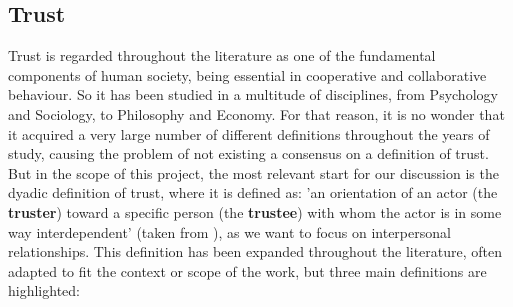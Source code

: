 \subsection{Trust}
\label{subsec:Trust}
Trust is regarded throughout the literature as one of the fundamental components of human society, being essential in cooperative and collaborative behaviour. So it has been studied in a multitude of disciplines, from Psychology and Sociology, to Philosophy and Economy\cite{Rousseau1998, Jones1997, Sabater2005}. For that reason, it is no wonder that it acquired a very large number of different definitions throughout the years of study, causing the problem of not existing a consensus on a definition of trust\cite{Castelfranchi2010}. But in the scope of this project, the most relevant start for our discussion is the dyadic definition of trust, where it is defined as: 'an orientation of an actor (the \textbf{truster}) toward a specific person (the \textbf{trustee}) with whom the actor is in some way interdependent' (taken from \cite{Simpson2007}), as we want to focus on interpersonal relationships. This definition has been expanded throughout the literature, often adapted to fit the context or scope of the work, but three main definitions are highlighted:
